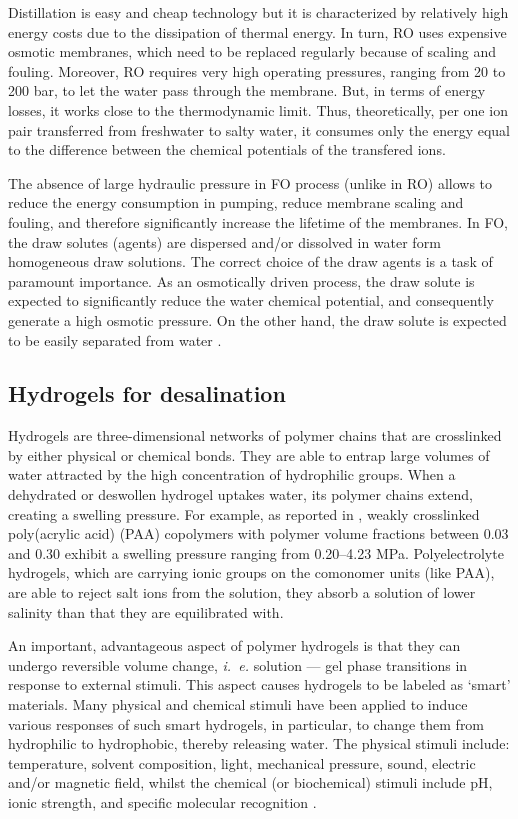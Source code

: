 \documentclass[journal,article,submit,pdftex,moreauthors]{Definitions/mdpi}
\newcommand{\ie}{\textit{i.~e.} }
\begin{document}
Distillation is easy and cheap technology but it is characterized by relatively high energy costs due to the dissipation of thermal energy. 
In turn, RO uses expensive osmotic membranes, which need to be replaced regularly because of scaling and fouling. 
Moreover, RO requires very high operating pressures, ranging from 20 to 200 bar, to let the water pass through the membrane. 
But, in terms of energy losses, it works close to the thermodynamic limit.
Thus, theoretically, per one ion pair transferred from freshwater to salty water, it consumes only the energy equal to the difference between the chemical potentials of the transfered ions.

The absence of large hydraulic pressure in FO process (unlike in RO) allows to reduce the energy consumption in pumping, reduce membrane scaling and fouling, and therefore significantly increase the lifetime of the membranes. 
In FO, the draw solutes (agents) are dispersed and/or dissolved in water form homogeneous draw solutions. 
The correct choice of the draw agents is a task of paramount importance. 
As an osmotically driven process, the draw solute is expected to significantly reduce the water chemical potential, and consequently generate a high osmotic pressure. 
On the other hand, the draw solute is expected to be easily separated from water \cite{Cai2016}.

\subsection{Hydrogels for desalination}
Hydrogels are three-dimensional networks of polymer chains that are crosslinked by either physical or chemical bonds. 
They are able to entrap large volumes of water attracted by the high concentration of hydrophilic groups. 
When a dehydrated or deswollen hydrogel uptakes water, its polymer chains extend, creating a swelling pressure. 
For example, as reported in \cite{Wack_2009}, weakly crosslinked poly(acrylic acid) (PAA) copolymers with polymer volume fractions between 0.03 and 0.30 exhibit a swelling pressure ranging from 0.20--4.23 MPa.
Polyelectrolyte hydrogels, which are carrying ionic groups on the comonomer units (like PAA), are able to reject salt ions from the solution, they absorb a solution of lower salinity than that they are equilibrated with. 

An important, advantageous aspect of polymer hydrogels is that they can undergo reversible volume change, \ie solution --- gel phase transitions in response to external stimuli. 
This aspect causes hydrogels to be labeled as ‘smart’ materials. 
Many physical and chemical stimuli have been applied to induce various responses of such smart hydrogels, in particular, to change them from hydrophilic to hydrophobic, thereby releasing water. 
The physical stimuli include: temperature, solvent composition, light, mechanical pressure, sound, electric and/or magnetic field, whilst the chemical (or biochemical) stimuli include pH, ionic strength, and specific molecular recognition \cite{Tanaka_1982,Serizawa_2001,Lietor_Santos_2009,Qiu_2001}.
\end{document}
